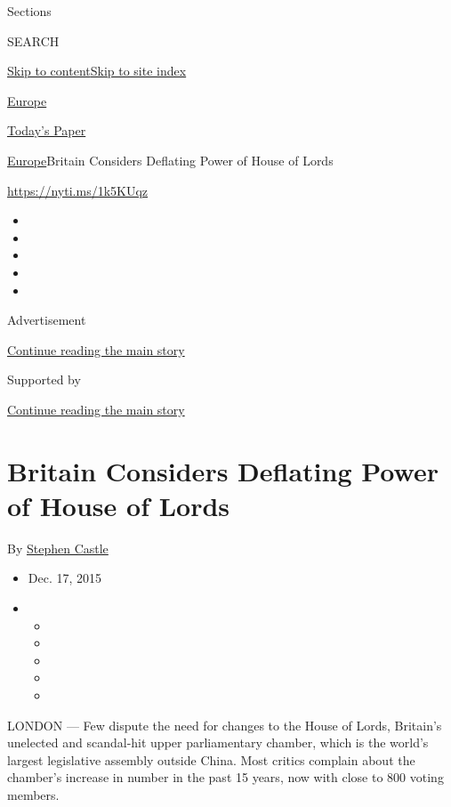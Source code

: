 Sections

SEARCH

\protect\hyperlink{site-content}{Skip to
content}\protect\hyperlink{site-index}{Skip to site index}

\href{https://www.nytimes.com/section/world/europe}{Europe}

\href{https://myaccount.nytimes.com/auth/login?response_type=cookie\&client_id=vi}{}

\href{https://www.nytimes.com/section/todayspaper}{Today's Paper}

\href{/section/world/europe}{Europe}\textbar{}Britain Considers
Deflating Power of House of Lords

\url{https://nyti.ms/1k5KUqz}

\begin{itemize}
\item
\item
\item
\item
\item
\end{itemize}

Advertisement

\protect\hyperlink{after-top}{Continue reading the main story}

Supported by

\protect\hyperlink{after-sponsor}{Continue reading the main story}

\hypertarget{britain-considers-deflating-power-of-house-of-lords}{%
\section{Britain Considers Deflating Power of House of
Lords}\label{britain-considers-deflating-power-of-house-of-lords}}

By \href{http://www.nytimes.com/by/stephen-castle}{Stephen Castle}

\begin{itemize}
\item
  Dec. 17, 2015
\item
  \begin{itemize}
  \item
  \item
  \item
  \item
  \item
  \end{itemize}
\end{itemize}

LONDON --- Few dispute the need for changes to the House of Lords,
Britain's unelected and scandal-hit upper parliamentary chamber, which
is the world's largest legislative assembly outside China. Most critics
complain about the chamber's increase in number in the past 15 years,
now with close to 800 voting members.

